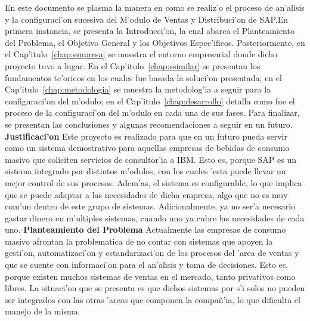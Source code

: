 \newline
\newline
	En este documento se plasma la manera en como se realiz'o el proceso de an'alisis y la configuraci'on sucesiva del M'odulo de Ventas y Distribuci'on de SAP.En primera instancia, se presenta la Introducci'on, la cual abarca el Planteamiento del Problema, el Objetivo General y los Objetivos Espec'ificos. Posteriormente, en el Cap'itulo~\ref{chap:empresa} se muestra el entorno empresarial donde dicho proyecto tuvo a lugar. En el Cap'itulo~\ref{chap:ssimilar} se presentan los fundamentos te'oricos en los cuales fue basada la soluci'on presentada; en el Cap'itulo~\ref{chap:metodologia} se muestra la metodolog'ia a seguir para la configuraci'on del m'odulo; en el Cap'itulo~\ref{chap:desarrollo} detalla como fue el proceso de la configuraci'on del m'odulo en cada una de sus fases. Para finalizar, se presentan las conclusiones y algunas recomendaciones a seguir en un futuro.
\newline
\newline
\label{sect:justificacion}
\textbf{Justificaci'on}
\newline
\newline
	Este proyecto es realizado para que en un futuro pueda servir como un sistema demostrativo para aquellas empresas de bebidas de consumo masivo que soliciten servicios de consultor'ia a IBM. Esto es, porque SAP es un sistema integrado por distintos m'odulos, con los cuales 'esta puede llevar un mejor control de sus procesos. Adem'as, el sistema es configurable, lo que implica que se puede adaptar a las necesidades de dicha empresa, algo que no es muy com'un dentro de este grupo de sistemas. Adicionalmente, ya no ser'a necesario gastar dinero en m'ultiples sistemas, cuando uno ya cubre las necesidades de cada uno.
\label{sect:planteamiento}
\newline
\newline
\textbf{Planteamiento del Problema}
\newline
\newline
	Actualmente las empresas de consumo masivo afrontan la problematica de no  contar con sistemas que apoyen la gesti'on, automatizaci'on y estandarizaci'on de los procesos del 'area de ventas y que se cuente con informaci'on para el an'alisis y toma de decisiones. Esto es, porque  existen muchos sistemas de ventas en el mercado, tanto privativos como libres. La situaci'on que se presenta es que dichos sistemas por s'i solos no pueden ser integrados con las otras 'areas que componen la compa\~n'ia, lo que dificulta el manejo de la misma. 
		
